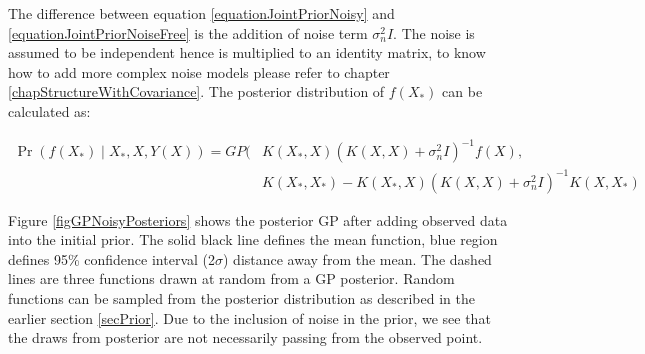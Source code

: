 The difference between equation \ref{equationJointPriorNoisy} and \ref{equationJointPriorNoiseFree} is the addition of noise term \(\sigma^{2}_{n}I\). The noise is assumed to be independent hence is multiplied to an identity matrix, to know how to add more complex noise models please refer to chapter \ref{chapStructureWithCovariance}. The posterior distribution of \(f(X_{*})\) can be calculated as:

  \begin{equation}\label{eqNoisyPredictiveGP}
  \begin{aligned}
      \Pr(f(X_{*}) \mid X_{*}, X, Y(X)) = GP(  & K(X_{*}, X)( K(X, X) + \sigma^{2}_{n}I)^{-1}f(X),   \\ 
                                & K(X_{*}, X_{*}) - K(X_{*}, X)( K(X, X) + \sigma^{2}_{n}I)^{-1} K(X, X_{*}) 
  \end{aligned}
  \end{equation}

Figure \ref{figGPNoisyPosteriors} shows the posterior GP after adding observed data into the initial prior. The solid black line defines the mean function, blue region defines 95\% confidence interval (2\(\sigma\)) distance away from the mean. The dashed lines are three functions drawn at random from a GP posterior. Random functions can be sampled from the posterior distribution as described in the earlier section \ref{secPrior}.  Due to the inclusion of noise in the prior, we see that the draws from posterior are not necessarily passing from the observed point.

